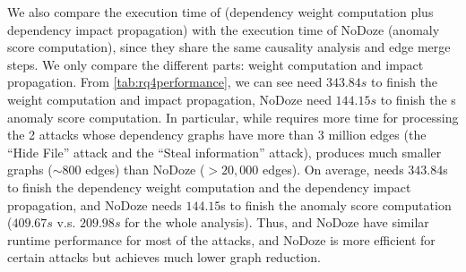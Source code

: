 We also compare the execution time of \tool (dependency weight computation plus dependency impact propagation) with the execution time of NoDoze (anomaly score computation), since they share the same causality analysis and edge merge steps. We only compare the different parts: weight computation and impact propagation.
From \cref{tab:rq4performance}, we can see \tool need $343.84s$ to finish the weight computation and impact propagation, NoDoze need $144.15s$ to finish the s anomaly score computation.
%
In particular, while \tool requires more time for processing the 2 attacks whose dependency graphs have more than 3 million edges (\ie the ``Hide File'' attack and the ``Steal information'' attack), \tool produces much smaller graphs ($\sim800$ edges) than NoDoze ($>20,000$ edges).
On average, \tool needs $343.84$s to finish the dependency weight computation and the dependency impact propagation, and NoDoze needs $144.15$s to finish the anomaly score computation ($409.67s$ v.s. $209.98s$ for the whole analysis).
%
Thus, \tool and NoDoze have similar runtime performance for most of the attacks, and NoDoze is more efficient for certain attacks but achieves much lower graph reduction. 



